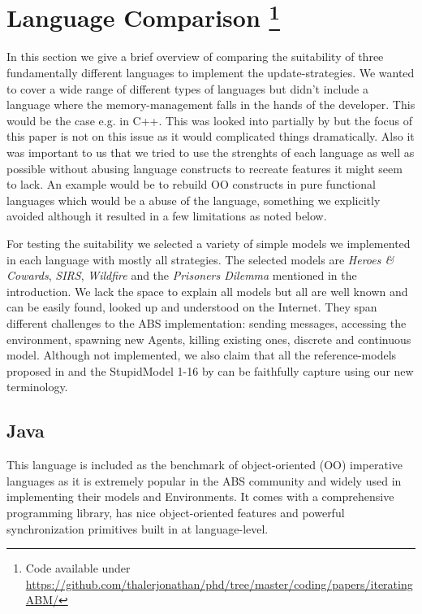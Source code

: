 \section[Language Comparison]{Language Comparison \footnote{Code available under\\ \url{https://github.com/thalerjonathan/phd/tree/master/coding/papers/iteratingABM/}}}
In this section we give a brief overview of comparing the suitability of three fundamentally different languages to implement the update-strategies. We wanted to cover a wide range of different types of languages but didn't include a language where the memory-management falls in the hands of the developer. This would be the case e.g. in C++. This was looked into partially by \cite{dawson_opening_2014} but the focus of this paper is not on this issue as it would complicated things dramatically. Also it was important to us that we tried to use the strenghts of each language as well as possible without abusing language constructs to recreate features it might seem to lack. An example would be to rebuild OO constructs in pure functional languages which would be a abuse of the language, something we explicitly avoided although it resulted in a few limitations as noted below.

For testing the suitability we selected a variety of simple models we implemented in each language with mostly all strategies. The selected models are \textit{Heroes \& Cowards}, \textit{SIRS}, \textit{Wildfire} and the \textit{Prisoners Dilemma} mentioned in the introduction. We lack the space to explain all models but all are well known and can be easily found, looked up and understood on the Internet. They span different challenges to the ABS implementation: sending messages, accessing the environment, spawning new Agents, killing existing ones, discrete and continuous model. Although not implemented, we also claim that all the reference-models proposed in \cite{isaac_abm_2011} and the StupidModel 1-16 by \cite{railsback_stupidmodel_2005} can be faithfully capture using our new terminology.


\subsection{Java}
This language is included as the benchmark of object-oriented (OO) imperative languages as it is extremely popular in the ABS community and widely used in implementing their models and Environments. It comes with a comprehensive programming library, has nice object-oriented features and powerful synchronization primitives built in at language-level.

